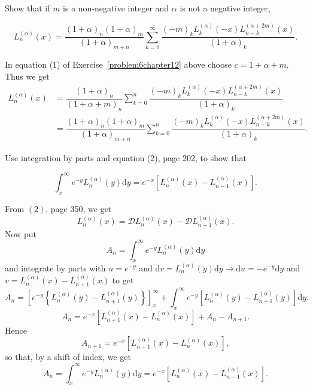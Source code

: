 \begin{problem}\label{problem7chapter12}
Show that if $m$ is a non-negative integer and $\alpha$ is not a negative integer,

$$L_n^{(\alpha)}(x) = \dfrac{(1+\alpha)_n (1 + \alpha)_m}{(1 + \alpha)_{m+n}} \displaystyle\sum_{k=0}^{\infty} \dfrac{(-m)_k L_k^{(\alpha)} (-x) L_{n-k}^{(\alpha+2m)}(x)}{(1 + \alpha)_k}.$$
\end{problem}
\begin{solution}
In equation (1) of Exercise~\ref{problem6chapter12} above choose $c = 1 + \alpha + m$. Thus we get
$$\begin{array}{ll}
L_n^{(\alpha)}(x) &= \dfrac{(1+\alpha)_n}{(1+\alpha+m)_n} \displaystyle\sum_{k=0}^n \dfrac{(-m)_k L_k^{(\alpha)}(-x) L_{n-k}^{(\alpha+2m)}(x)}{(1+\alpha)_k} \\
&= \dfrac{(1+\alpha)_n (1+\alpha)_m}{(1+\alpha)_{m+n}} \displaystyle\sum_{k=0}^n \dfrac{(-m)_k L_k^{(\alpha)}(-x) L_{n-k}^{(\alpha+2m)}(x)}{(1+\alpha)_k}.
\end{array}$$
\end{solution}
\begin{problem}\label{problem8chapter12}
Use integration by parts and equation (2), page 202, to show that

$$\displaystyle\int_x^{\infty} e^{-y} L_n^{(\alpha)}(y) \mathrm{d}y = e^{-x}[L_n^{(\alpha)}(x) - L_{n-1}^{(\alpha)}(x)].$$
\end{problem}
\begin{solution}
From $(2)$, page 350, we get
$$L_n^{(\alpha)}(x) = \mathscr{D} L_n^{(\alpha)}(x) - \mathscr{D} L_{n+1}^{(\alpha)}(x).$$
Now put 
$$A_n = \displaystyle\int_x^{\infty} e^{-y} L_n^{(\alpha)}(y)\mathrm{d}y$$
and integrate by parts with $u= e^{-y}$ and $\mathrm{d}v=L_n^{(\alpha)}(y)\mathrm{d}y \longrightarrow \mathrm{d}u = -e^{-y} \mathrm{d}y$ and $v = L_n^{(\alpha)}(x)-L_{n+1}^{(\alpha)}(x)$ to get
$$A_n = \left[ e^{-y} \left\{ L_n^{(\alpha)}(y) - L_{n+1}^{(\alpha)}(y) \right\} \right]_{x}^{\infty} + \displaystyle\int_x^{\infty} e^{-y} \left[ L_n^{(\alpha)}(y) - L_{n+1}^{(\alpha)}(y) \right] \mathrm{d}y.$$
$$A_n = e^{-x} \left[ L_{n+1}^{(\alpha)}(x) - L_n^{(\alpha)}(x) \right] + A_n - A_{n+1}.$$
Hence
$$A_{n+1} = e^{-x} \left[ L_{n+1}^{(\alpha)}(x) - L_n^{(\alpha)}(x) \right],$$
so that, by a shift of index, we get
$$A_n = \displaystyle\int_x^{\infty} e^{-y} L_n^{(\alpha)}(y) \mathrm{d}y = e^{-x} \left[ L_n^{(\alpha)}(x) - L_{n-1}^{(\alpha)}(x) \right].$$
\end{solution}
